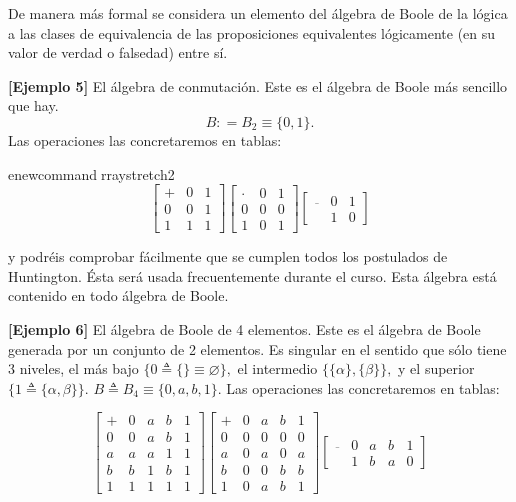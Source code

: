   De manera más formal se considera un elemento del álgebra de Boole de
  la lógica a las clases de equivalencia de las proposiciones
  equivalentes lógicamente (en su valor de verdad o falsedad) entre sí.

  \textbf{{[}Ejemplo 5{]}} El álgebra de conmutación. Este es el álgebra
  de Boole más sencillo que hay. \[B{{: = B_{2}} \equiv {\{{0,1}\}}} . \]
  Las operaciones las concretaremos en tablas:

  \setcounter{MaxMatrixCols}{20}
  \setlength{\arraycolsep}{8pt} %
  

enewcommand{rraystretch}{2}
  \[\begin{bmatrix}
   + & 0 & 1 \\
  0 & 0 & 1 \\
  1 & 1 & 1
  \end{bmatrix}\begin{bmatrix}
   \cdot & 0 & 1 \\
  0 & 0 & 0 \\
  1 & 0 & 1
  \end{bmatrix}\begin{bmatrix}
  \overline{} & 0 & 1 \\
   & 1 & 0
  \end{bmatrix}\]

  y podréis comprobar fácilmente que se cumplen todos los postulados de
  Huntington. Ésta será usada frecuentemente durante el curso. Esta
  álgebra está contenido en todo álgebra de Boole.

  \textbf{{[}Ejemplo 6{]}} El álgebra de Boole de 4 elementos. Este es
  el álgebra de Boole generada por un conjunto de 2 elementos. Es
  singular en el sentido que sólo tiene 3 niveles, el más bajo
  $\{0 \triangleq \{\} \equiv \varnothing \},$ el intermedio
  $\{\{\alpha\},\{\beta\}\},$ y el superior
  $\{1 \triangleq \{\alpha,\beta\}\}.$
  $B \triangleq B_{4} \equiv \{0,a,b,1\}.$ Las operaciones las
  concretaremos en tablas:

  \[\begin{bmatrix}
   + & 0 & a & b & 1 \\
  0 & 0 & a & b & 1 \\
  a & a & a & 1 & 1 \\
  b & b & 1 & b & 1 \\
  1 & 1 & 1 & 1 & 1
  \end{bmatrix}\begin{bmatrix}
   + & 0 & a & b & 1 \\
  0 & 0 & 0 & 0 & 0 \\
  a & 0 & a & 0 & a \\
  b & 0 & 0 & b & b \\
  1 & 0 & a & b & 1
  \end{bmatrix}\begin{bmatrix}
  \overline{} & 0 & a & b & 1 \\
   & 1 & b & a & 0
  \end{bmatrix}\]

